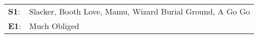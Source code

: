 \begin{supertabular}{p{0.03\textwidth}p{0.92\textwidth}}
 \textbf{S1}:  &  Slacker\textsuperscript{}, \enspace Booth Love\textsuperscript{}, \enspace Mamu\textsuperscript{}, \enspace Wizard Burial Ground\textsuperscript{}, \enspace A Go Go\textsuperscript{}  \enspace  \\
 \textbf{E1}:  &                                                                                                                                                          Much Obliged\textsuperscript{}  \enspace  \\
\end{supertabular}
